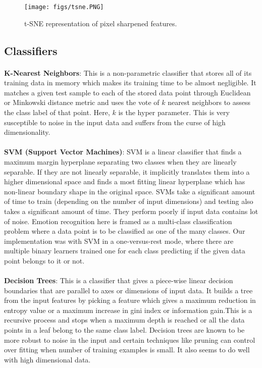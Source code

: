 \documentclass[10pt,twocolumn,letterpaper]{article}
\begin{document}
\begin{figure}[h]
\texttt{[image: figs/tsne.PNG]}
\caption{t-SNE representation of pixel sharpened features.}
\label{fig:tsne}
\end{figure}

\subsection{Classifiers}
\paragraph{}
\textbf{K-Nearest Neighbors}: This is a non-parametric classifier that stores all of its training data in memory which makes its training time to be almost negligible. It matches a given test sample to each of the stored data point through Euclidean or Minkowski distance metric and uses the vote of $k$ nearest neighbors to assess the class label of that point. Here, $k$ is the hyper parameter. This is very susceptible to noise in the input data and suffers from the curse of high dimensionality.

\paragraph{}
\textbf{SVM (Support Vector Machines)}: SVM is a linear classifier that finds a maximum margin hyperplane separating two classes when they are linearly separable. If they are not linearly separable, it implicitly translates them into a higher dimensional space and finds a most fitting linear hyperplane which has non-linear boundary shape in the original space. SVMs take a significant amount of time to train (depending on the number of input dimensions) and testing also takes a significant amount of time. They perform poorly if input data contains lot of noise. Emotion recognition here is framed as a multi-class classification problem where a data point is to be classified as one of the many classes. Our implementation was with SVM in a one-versus-rest mode, where there are multiple binary learners trained one for each class predicting if the given data point belongs to it or not.

\paragraph{}
\textbf{Decision Trees}: This is a classifier that gives a piece-wise linear decision boundaries that are parallel to axes or dimensions of input data. It builds a tree from the input features by picking a feature which gives a maximum reduction in  entropy value or a maximum increase in gini index or information gain.This is a recursive process and stops when a maximum depth is reached or all the data points in a leaf belong to the same class label. Decision trees are known to be more robust to noise in the input and certain techniques like pruning can control over fitting when number of training examples is small. It also seems to do well with high dimensional data.
\end{document}
